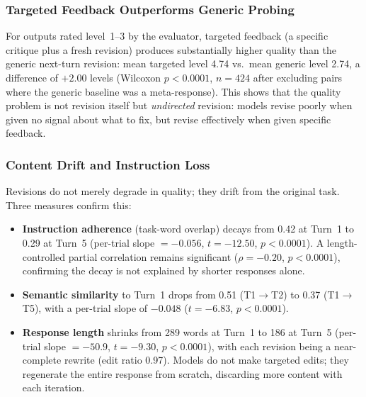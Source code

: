 \subsubsection{Targeted Feedback Outperforms Generic Probing}

For outputs rated level~1--3 by the evaluator, targeted feedback (a specific critique plus a fresh revision) produces substantially higher quality than the generic next-turn revision: mean targeted level 4.74 vs.\ mean generic level 2.74, a difference of $+2.00$ levels (Wilcoxon $p < 0.0001$, $n = 424$ after excluding pairs where the generic baseline was a meta-response). This shows that the quality problem is not revision itself but \textit{undirected} revision: models revise poorly when given no signal about what to fix, but revise effectively when given specific feedback.

\subsubsection{Content Drift and Instruction Loss}

Revisions do not merely degrade in quality; they drift from the original task. Three measures confirm this:

\begin{itemize}
    \item \textbf{Instruction adherence} (task-word overlap) decays from 0.42 at Turn~1 to 0.29 at Turn~5 (per-trial slope $= -0.056$, $t = -12.50$, $p < 0.0001$). A length-controlled partial correlation remains significant ($\rho = -0.20$, $p < 0.0001$), confirming the decay is not explained by shorter responses alone.
    \item \textbf{Semantic similarity} to Turn~1 drops from 0.51 (T1$\to$T2) to 0.37 (T1$\to$T5), with a per-trial slope of $-0.048$ ($t = -6.83$, $p < 0.0001$).
    \item \textbf{Response length} shrinks from 289 words at Turn~1 to 186 at Turn~5 (per-trial slope $= -50.9$, $t = -9.30$, $p < 0.0001$), with each revision being a near-complete rewrite (edit ratio 0.97). Models do not make targeted edits; they regenerate the entire response from scratch, discarding more content with each iteration.
\end{itemize}
